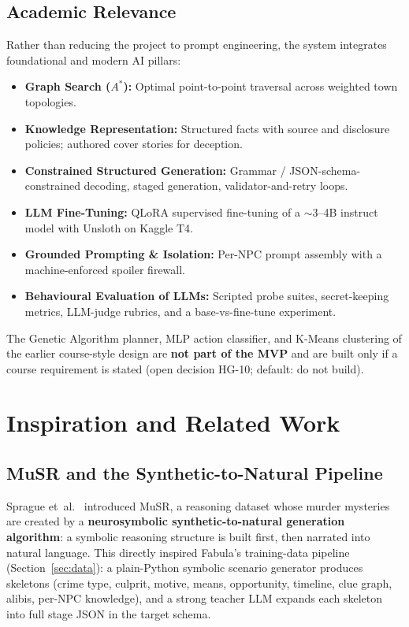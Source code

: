 \documentclass[11pt,a4paper]{article}
\begin{document}
\subsection{Academic Relevance}
Rather than reducing the project to prompt engineering, the system integrates foundational and modern AI pillars:
\begin{itemize}
    \item \textbf{Graph Search ($A^*$):} Optimal point-to-point traversal across weighted town topologies.
    \item \textbf{Knowledge Representation:} Structured facts with source and disclosure policies; authored cover stories for deception.
    \item \textbf{Constrained Structured Generation:} Grammar / JSON-schema-constrained decoding, staged generation, validator-and-retry loops.
    \item \textbf{LLM Fine-Tuning:} QLoRA supervised fine-tuning of a $\sim$3--4B instruct model with Unsloth on Kaggle T4.
    \item \textbf{Grounded Prompting \& Isolation:} Per-NPC prompt assembly with a machine-enforced spoiler firewall.
    \item \textbf{Behavioural Evaluation of LLMs:} Scripted probe suites, secret-keeping metrics, LLM-judge rubrics, and a base-vs-fine-tune experiment.
\end{itemize}
The Genetic Algorithm planner, MLP action classifier, and K-Means clustering of the earlier course-style design are \textbf{not part of the MVP} and are built only if a course requirement is stated (open decision HG-10; default: do not build).

\section{Inspiration and Related Work}

\subsection{MuSR and the Synthetic-to-Natural Pipeline}
Sprague et~al.~\cite{sprague2024musr} introduced MuSR, a reasoning dataset whose murder mysteries are created by a \textbf{neurosymbolic synthetic-to-natural generation algorithm}: a symbolic reasoning structure is built first, then narrated into natural language. This directly inspired Fabula's training-data pipeline (Section~\ref{sec:data}): a plain-Python symbolic scenario generator produces skeletons (crime type, culprit, motive, means, opportunity, timeline, clue graph, alibis, per-NPC knowledge), and a strong teacher LLM expands each skeleton into full stage JSON in the target schema.
\end{document}
